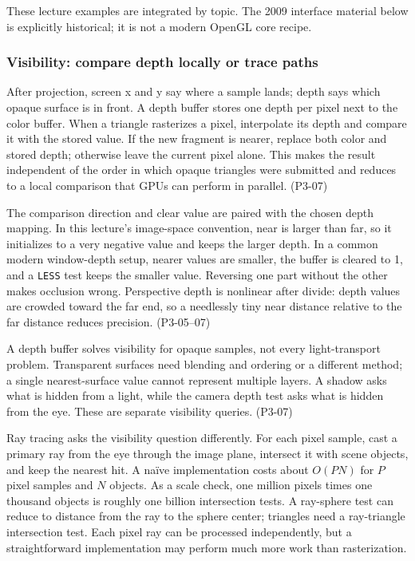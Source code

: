 These lecture examples are integrated by topic. The 2009 interface material below is explicitly historical; it is not a modern OpenGL core recipe.

\subsubsection{Visibility: compare depth locally or trace paths}\label{04-visual-computing-ii-ch029-visibility-compare-depth-locally-or-trace-paths}

After projection, screen x and y say where a sample lands; depth says which opaque surface is in front. A depth buffer stores one depth per pixel next to the color buffer. When a triangle rasterizes a pixel, interpolate its depth and compare it with the stored value. If the new fragment is nearer, replace both color and stored depth; otherwise leave the current pixel alone. This makes the result independent of the order in which opaque triangles were submitted and reduces to a local comparison that GPUs can perform in parallel. (P3-07)

The comparison direction and clear value are paired with the chosen depth mapping. In this lecture's image-space convention, near is larger than far, so it initializes to a very negative value and keeps the larger depth. In a common modern window-depth setup, nearer values are smaller, the buffer is cleared to 1, and a \texttt{LESS} test keeps the smaller value. Reversing one part without the other makes occlusion wrong. Perspective depth is nonlinear after divide: depth values are crowded toward the far end, so a needlessly tiny near distance relative to the far distance reduces precision. (P3-05--07)

A depth buffer solves visibility for opaque samples, not every light-transport problem. Transparent surfaces need blending and ordering or a different method; a single nearest-surface value cannot represent multiple layers. A shadow asks what is hidden from a light, while the camera depth test asks what is hidden from the eye. These are separate visibility queries. (P3-07)

Ray tracing asks the visibility question differently. For each pixel sample, cast a primary ray from the eye through the image plane, intersect it with scene objects, and keep the nearest hit. A naïve implementation costs about \(O(PN)\) for \(P\) pixel samples and \(N\) objects. As a scale check, one million pixels times one thousand objects is roughly one billion intersection tests. A ray-sphere test can reduce to distance from the ray to the sphere center; triangles need a ray-triangle intersection test. Each pixel ray can be processed independently, but a straightforward implementation may perform much more work than rasterization.

